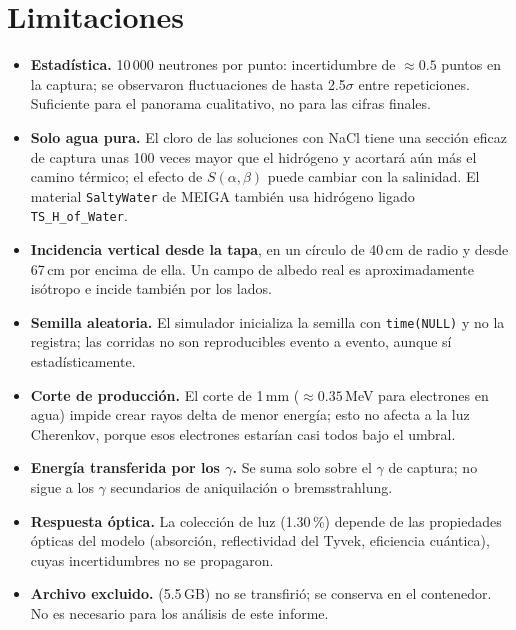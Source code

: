 \documentclass[11pt,a4paper]{article}
\newcommand{\archivo}[1]{\path{#1}}
\newcommand{\var}[1]{\texttt{#1}}
\newcommand{\sab}{$S(\alpha,\beta)$}
\begin{document}
\section{Limitaciones}
\label{sec:limitaciones}

\begin{itemize}
  \item \textbf{Estadística.} 10\,000 neutrones por punto: incertidumbre de $\approx0.5$ puntos en la captura; se observaron fluctuaciones de hasta 2.5$\sigma$ entre repeticiones. Suficiente para el panorama cualitativo, no para las cifras finales.
  \item \textbf{Solo agua pura.} El cloro de las soluciones con NaCl tiene una sección eficaz de captura unas 100 veces mayor que el hidrógeno y acortará aún más el camino térmico; el efecto de \sab{} puede cambiar con la salinidad. El material \var{SaltyWater} de MEIGA también usa hidrógeno ligado \var{TS\_H\_of\_Water}.
  \item \textbf{Incidencia vertical desde la tapa}, en un círculo de 40\,cm de radio y desde 67\,cm por encima de ella. Un campo de albedo real es aproximadamente isótropo e incide también por los lados.
  \item \textbf{Semilla aleatoria.} El simulador inicializa la semilla con \var{time(NULL)} y no la registra; las corridas no son reproducibles evento a evento, aunque sí estadísticamente.
  \item \textbf{Corte de producción.} El corte de 1\,mm ($\approx0.35$\,MeV para electrones en agua) impide crear rayos delta de menor energía; esto no afecta a la luz Cherenkov, porque esos electrones estarían casi todos bajo el umbral.
  \item \textbf{Energía transferida por los $\gamma$.} Se suma solo sobre el $\gamma$ de captura; no sigue a los $\gamma$ secundarios de aniquilación o bremsstrahlung.
  \item \textbf{Respuesta óptica.} La colección de luz (1.30\,\%) depende de las propiedades ópticas del modelo (absorción, reflectividad del Tyvek, eficiencia cuántica), cuyas incertidumbres no se propagaron.
  \item \textbf{Archivo excluido.} \archivo{pasos-particulas.tsv} (5.5\,GB) no se transfirió; se conserva en el contenedor. No es necesario para los análisis de este informe.
\end{itemize}

\end{document}
